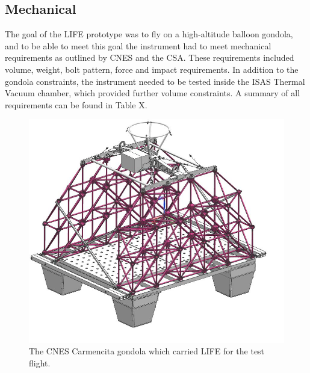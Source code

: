 \subsection{Mechanical}
The goal of the LIFE prototype was to fly on a high-altitude balloon gondola, and to be able to meet this goal the instrument had to meet mechanical requirements as outlined by CNES and the CSA. These requirements included volume, weight, bolt pattern, force and impact requirements. In addition to the gondola constraints, the instrument needed to be tested inside the ISAS Thermal Vacuum chamber, which provided further volume constraints. A summary of all requirements can be found in Table X.

\begin{figure}[h]
\centering
  \includegraphics[width=0.7\linewidth]{chap3_images/Carmencita_empty.png}
  \caption{The CNES Carmencita gondola which carried LIFE for the test flight.}
  \label{fig:Carmencita_empty}
\end{figure}

